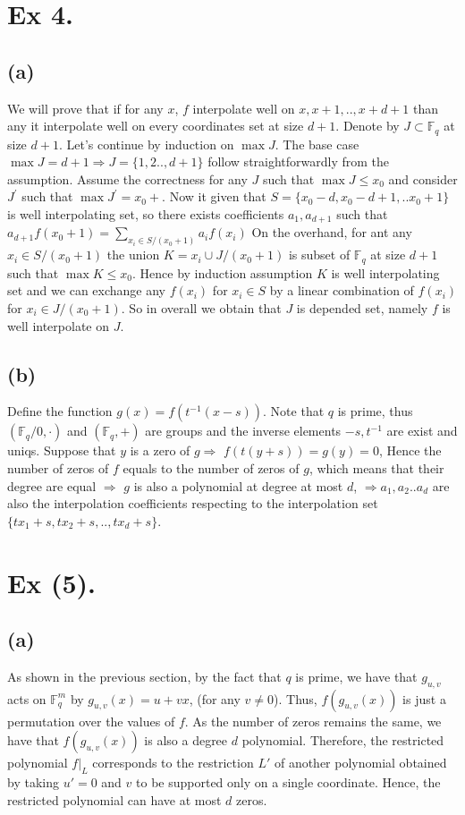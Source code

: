 \documentclass{article}
\newcommand{\FF}{\mathbb{F}}
\begin{document}
\section{Ex 4.}
\subsection{(a)} We will prove that if for any $x$, $f$ interpolate well on $ x, x+1, .. ,x+d+1$ than any it interpolate well on every coordinates set at size $d+1$. Denote by $J \subset \FF_{q}$ at size $d+1$. Let's continue by induction on $\max J$. The base case $\max J = d+1 \Rightarrow J = \{1,2 .., d+1\}$ follow straightforwardly from the assumption. Assume the correctness for any $J$ such that $\max J \le x_{0}$ and consider $J^{\prime}$ such that $\max J^{\prime} = x_{0} + $. 
Now it given that $ S = \{ x_{0} - d, x_{0} - d + 1, .. x_{0} + 1 \}$ is well interpolating set,  so there exists coefficients $a_{1}, a_{d+1}$ such that $a_{d+1}f(x_{0}+1) = \sum_{x_{i}\in S/(x_{0}+1)}{a_{i}f\left( x_{i} \right)}$ On the overhand, for ant any $x_{i} \in S / (x_{0}+1)$ the union $K = x_{i} \cup J / (x_{0} + 1)$ is subset of $\FF_{q}$ at size $d+1$ such that $\max K \le x_{0}$.
Hence by induction assumption $K$ is well interpolating set and we can exchange any $f(x_{i})$ for $x_{i} \in S$ by a linear combination of $f(x_{i})$ for $x_{i} \in J/ ( x_{0} + 1)$. So in overall we obtain that $J$ is depended set, namely $f$ is well interpolate on $J$.  
\subsection{(b)} Define the function $g(x) = f(t^{-1}(x-s))$. Note that $q$ is prime, thus $\left( \FF_{q} / 0 , \cdot  \right)$ and  $ \left( \FF_{q} , +  \right)$ are groups and the inverse elements $-s,t^{-1}$ are exist and uniqs. Suppose that $y$ is a zero of $g \Rightarrow$ $f(t(y+s)) = g(y) = 0$, Hence the number of zeros of $f$ equals to the number of zeros of $g$, which means that their degree are equal $\Rightarrow$ $g$ is also a polynomial at degree at most $d$, $\Rightarrow a_{1}, a_{2} .. a_{d}$ are also the interpolation coefficients respecting to the interpolation set $\{ tx_{1}+s, tx_{2}+s, .., tx_{d} +s  \}$. 



\section{Ex (5).}
\subsection{(a)} As shown in the previous section, by the fact that $q$ is prime, we have that $g_{u,v}$ acts on $\FF_{q}^{m}$ by $g_{u,v}(x) = u + vx$, (for any $v \neq 0$). Thus, $f(g_{u,v}(x))$ is just a permutation over the values of $f$. As the number of zeros remains the same, we have that $f(g_{u,v}(x))$ is also a degree $d$ polynomial. Therefore, the restricted polynomial $f|_{L}$ corresponds to the restriction $L'$ of another polynomial obtained by taking $u' = 0$ and $v$ to be supported only on a single coordinate. Hence, the restricted polynomial can have at most $d$ zeros.
\end{document}
